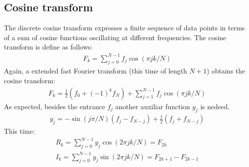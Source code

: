 \documentclass[letterpaper]{article}
\begin{document}
\subsection{Cosine transform}
The discrete cosine transform expresses a finite sequence of data points in terms of a sum of cosine functions oscillating at different frequencies.
The cosine transform is define as follows:
\begin{align}
F_k= \sum_{j=0}^{N-1}f_j \cos(\pi j k /N)	
\end{align}
Again, a extended fast Fourier transform (this time of length $N+1$) obtains the cosine transform:
\begin{align}
F_k= \frac{1}{2}(f_0+(-1)^kf_N)+\sum_{j=1}^{N-1}f_j \cos(\pi j k /N)	
\end{align}
As expected, besides the entrance $f_j$ another auxiliar function $y_j$ is nedeed.
\begin{align}
y_j=-\sin(j\pi /N)(f_j-f_{N-j})+\frac{1}{2}(f_j+f_{N-j})
\end{align}
This time:
\begin{align}
R_k=\sum_{j=0}^{N-1}y_j\cos(2\pi jk/N)=F_{2k}\\
I_k=\sum_{j=0}^{N-1}y_j\sin(2\pi jk/N)=F_{2k+1}-F_{2k-1}
\end{align}
\end{document}
